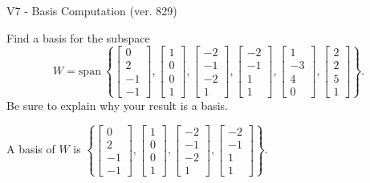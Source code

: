 \begin{exercise}
  \begin{exerciseTitle}V7 - Basis Computation (ver. 829)\end{exerciseTitle}
  \begin{exerciseStatement}
    Find a basis for the subspace 
\[W=\mathrm{span}\ \left\{\left[\begin{array}{r}
0 \\
2 \\
-1 \\
-1
\end{array}\right] , \left[\begin{array}{r}
1 \\
0 \\
0 \\
1
\end{array}\right] , \left[\begin{array}{r}
-2 \\
-1 \\
-2 \\
1
\end{array}\right] , \left[\begin{array}{r}
-2 \\
-1 \\
1 \\
1
\end{array}\right] , \left[\begin{array}{r}
1 \\
-3 \\
4 \\
0
\end{array}\right] , \left[\begin{array}{r}
2 \\
2 \\
5 \\
1
\end{array}\right]\right\}.\]
 Be sure to explain why your result is a basis.


  \end{exerciseStatement}
  \begin{exerciseAnswer}
   A basis of \(W\) is  \(\left\{\left[\begin{array}{r}
0 \\
2 \\
-1 \\
-1
\end{array}\right] , \left[\begin{array}{r}
1 \\
0 \\
0 \\
1
\end{array}\right] , \left[\begin{array}{r}
-2 \\
-1 \\
-2 \\
1
\end{array}\right] , \left[\begin{array}{r}
-2 \\
-1 \\
1 \\
1
\end{array}\right]\right\}\).
  


  \end{exerciseAnswer}
\end{exercise}